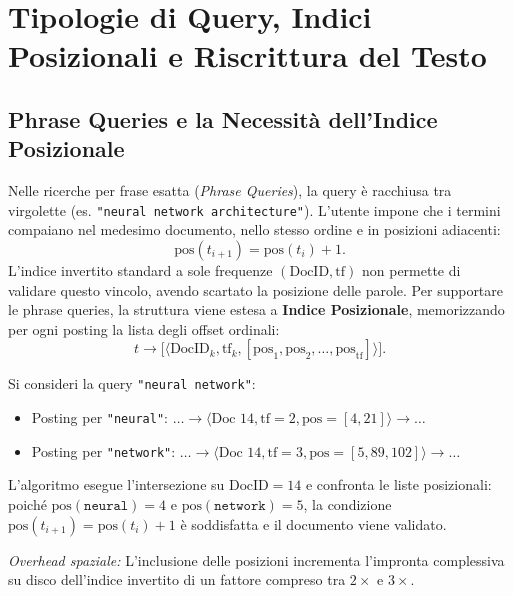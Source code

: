 \FloatBarrier
\section{Tipologie di Query, Indici Posizionali e Riscrittura del Testo}
\label{sec:query-expansion-posizionali}

\subsection{Phrase Queries e la Necessit\`a dell'Indice Posizionale}
Nelle ricerche per frase esatta (\textit{Phrase Queries}), la query \`e racchiusa tra virgolette (es. \texttt{"neural network architecture"}). L'utente impone che i termini compaiano nel medesimo documento, nello stesso ordine e in posizioni adiacenti:
\begin{equation}
\text{pos}(t_{i+1}) = \text{pos}(t_i) + 1.
\end{equation}
L'indice invertito standard a sole frequenze $(\text{DocID}, \text{tf})$ non permette di validare questo vincolo, avendo scartato la posizione delle parole. Per supportare le phrase queries, la struttura viene estesa a \textbf{Indice Posizionale}, memorizzando per ogni posting la lista degli offset ordinali:
\begin{equation}
t \longrightarrow \big[ \langle \text{DocID}_k, \text{tf}_k, [\text{pos}_1, \text{pos}_2, \dots, \text{pos}_{\text{tf}}] \rangle \big].
\end{equation}

\begin{example}
Si consideri la query \texttt{"neural network"}:
\begin{itemize}
    \item Posting per \texttt{"neural"}: $\dots \to \langle \text{Doc } 14, \text{tf}=2, \text{pos}=[4, 21] \rangle \to \dots$
    \item Posting per \texttt{"network"}: $\dots \to \langle \text{Doc } 14, \text{tf}=3, \text{pos}=[5, 89, 102] \rangle \to \dots$
\end{itemize}
L'algoritmo esegue l'intersezione su $\text{DocID} = 14$ e confronta le liste posizionali: poich\'e $\text{pos}(\texttt{neural}) = 4$ e $\text{pos}(\texttt{network}) = 5$, la condizione $\text{pos}(t_{i+1}) = \text{pos}(t_i) + 1$ \`e soddisfatta e il documento viene validato.
\end{example}
\textit{Overhead spaziale:} L'inclusione delle posizioni incrementa l'impronta complessiva su disco dell'indice invertito di un fattore compreso tra $2\times$ e $3\times$.

